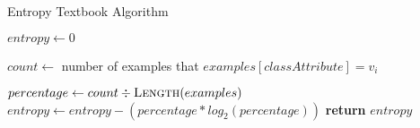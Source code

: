 \begin{algorithm}[H]
\caption{Entropy Textbook Algorithm}\label{a:id3-Entropy-simple}
\begin{algorithmic}[1]
    \State $entropy \gets 0$

        \State $count \gets$ number of examples that $examples[classAttribute] = v_i$

        \State $percentage \gets count \div \textsc{Length}(examples)$
            \State $entropy \gets entropy - (percentage * log_2 (percentage))$
        \EndIf
    \EndFor
    \State \textbf{return} $entropy$
\EndProcedure
\end{algorithmic}
\end{algorithm}
